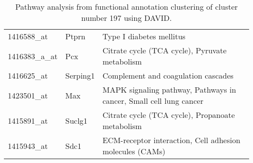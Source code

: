 \begin{table}
\begin{tabularx}{0.99\textwidth}{ l l X }
	1416588_at &	Ptprn	& Type I diabetes mellitus\\
	1416383_a_at &	Pcx	& Citrate cycle (TCA cycle), Pyruvate metabolism\\
	1416625_at &	Serping1	& Complement and coagulation cascades\\
	1423501_at &	Max	& MAPK signaling pathway, Pathways in cancer, Small cell lung cancer\\
	1415891_at &	Suclg1	& Citrate cycle (TCA cycle), Propanoate metabolism\\
	1415943_at &	Sdc1	& ECM-receptor interaction, Cell adhesion molecules (CAMs)\\
    \bottomrule
    \end{tabularx}
	  \caption[Pathway analysis from functional annotation clustering]
	  {Pathway analysis from functional annotation clustering of cluster number 197 using DAVID.
	  \label{table:funAnno}}
\end{table}


